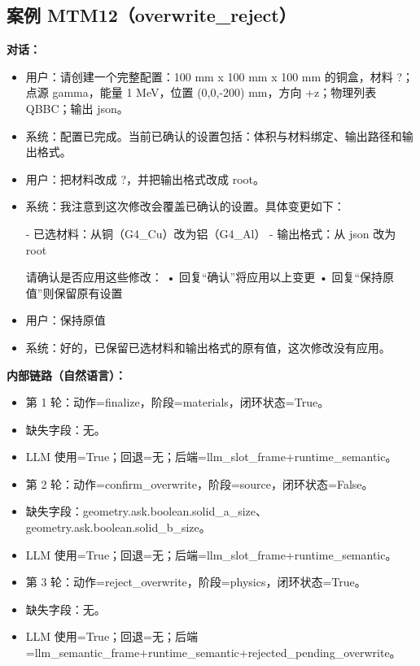 \documentclass[11pt]{ctexart}
\begin{document}
\subsection{案例 MTM12（overwrite\_reject）}
\textbf{对话：}
\begin{itemize}
\item 用户：请创建一个完整配置：100 mm x 100 mm x 100 mm 的铜盒，材料 ?；点源 gamma，能量 1 MeV，位置 (0,0,-200) mm，方向 +z；物理列表 QBBC；输出 json。
\item 系统：配置已完成。当前已确认的设置包括：体积与材料绑定、输出路径和输出格式。
\item 用户：把材料改成 ?，并把输出格式改成 root。
\item 系统：我注意到这次修改会覆盖已确认的设置。具体变更如下：

- 已选材料：从铜（G4\_Cu）改为铝（G4\_Al）
- 输出格式：从 json 改为 root

请确认是否应用这些修改：
• 回复“确认”将应用以上变更
• 回复“保持原值”则保留原有设置
\item 用户：保持原值
\item 系统：好的，已保留已选材料和输出格式的原有值，这次修改没有应用。
\end{itemize}
\textbf{内部链路（自然语言）：}
\begin{itemize}
\item 第 1 轮：动作=finalize，阶段=materials，闭环状态=True。
\item 缺失字段：无。
\item LLM 使用=True；回退=无；后端=llm\_slot\_frame+runtime\_semantic。
\item 第 2 轮：动作=confirm\_overwrite，阶段=source，闭环状态=False。
\item 缺失字段：geometry.ask.boolean.solid\_a\_size、geometry.ask.boolean.solid\_b\_size。
\item LLM 使用=True；回退=无；后端=llm\_slot\_frame+runtime\_semantic。
\item 第 3 轮：动作=reject\_overwrite，阶段=physics，闭环状态=True。
\item 缺失字段：无。
\item LLM 使用=True；回退=无；后端=llm\_semantic\_frame+runtime\_semantic+rejected\_pending\_overwrite。
\end{itemize}
\end{document}

